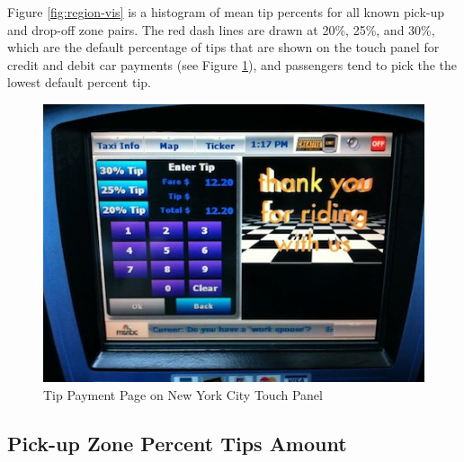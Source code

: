 \documentclass[12pt,twoside]{reedthesis}
\theoremstyle{definition}
\theoremstyle{definition}
\theoremstyle{definition}
\theoremstyle{remark}
\begin{document}
Figure \ref{fig:region-vis} is a histogram of mean tip percents for all
known pick-up and drop-off zone pairs. The red dash lines are drawn at
20\%, 25\%, and 30\%, which are the default percentage of tips that are
shown on the touch panel for credit and debit car payments (see Figure
\ref{fig:taxi-screen}), and passengers tend to pick the the lowest
default percent tip.
\begin{figure}

{\centering \includegraphics[width=4.8in]{figure/taxi-screen} 

}

\caption{Tip Payment Page on New York City Touch Panel}\label{fig:taxi-screen}
\end{figure}
\subsection{Pick-up Zone Percent Tips
Amount}\label{pick-up-zone-percent-tips-amount}
\end{document}
